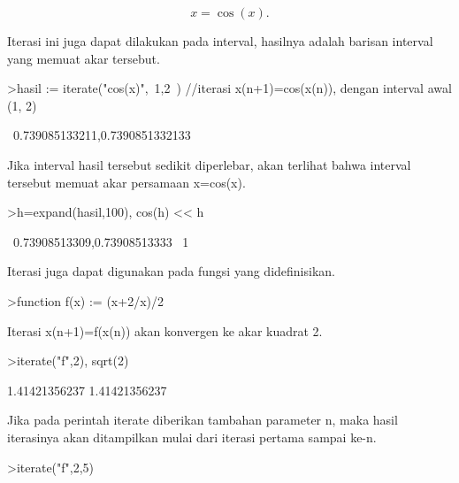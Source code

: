 \documentclass{article}
\newenvironment{eulernotebook}{\par}{\par}
\newenvironment{eulercomment}{\par\medskip}{\par\medskip}
\newenvironment{eulerformula}{}{}
\begin{document}
\begin{eulernotebook}
\begin{eulercomment}
\begin{eulercomment}
\begin{eulercomment}
\begin{eulercomment}
\begin{eulercomment}
\begin{eulercomment}
\begin{eulercomment}
\end{eulercomment}
\begin{eulerformula}
\[
x = \cos(x).
\]
\end{eulerformula}
\begin{eulercomment}
Iterasi ini juga dapat dilakukan pada interval, hasilnya adalah
barisan interval yang memuat akar tersebut.
\end{eulercomment}
\begin{eulerprompt}
>hasil := iterate("cos(x)",~1,2~) //iterasi x(n+1)=cos(x(n)), dengan interval awal (1, 2)
\end{eulerprompt}
\begin{euleroutput}
  ~0.739085133211,0.7390851332133~
\end{euleroutput}
\begin{eulercomment}
Jika interval hasil tersebut sedikit diperlebar, akan terlihat bahwa interval tersebut
memuat akar persamaan x=cos(x).
\end{eulercomment}
\begin{eulerprompt}
>h=expand(hasil,100), cos(h) << h
\end{eulerprompt}
\begin{euleroutput}
  ~0.73908513309,0.73908513333~
  1
\end{euleroutput}
\begin{eulercomment}
Iterasi juga dapat digunakan pada fungsi yang didefinisikan.
\end{eulercomment}
\begin{eulerprompt}
>function f(x) := (x+2/x)/2
\end{eulerprompt}
\begin{eulercomment}
Iterasi x(n+1)=f(x(n)) akan konvergen ke akar kuadrat 2.
\end{eulercomment}
\begin{eulerprompt}
>iterate("f",2), sqrt(2)
\end{eulerprompt}
\begin{euleroutput}
  1.41421356237
  1.41421356237
\end{euleroutput}
\begin{eulercomment}
Jika pada perintah iterate diberikan tambahan parameter n, maka hasil iterasinya akan
ditampilkan mulai dari iterasi pertama sampai ke-n.
\end{eulercomment}
\begin{eulerprompt}
>iterate("f",2,5)
\end{eulerprompt}
\begin{euleroutput}
  [2,  1.5,  1.41667,  1.41422,  1.41421,  1.41421]

\end{euleroutput}
\end{eulercomment}
\end{eulercomment}
\end{eulercomment}
\end{eulercomment}
\end{eulercomment}
\end{eulercomment}
\end{eulernotebook}
\end{document}
